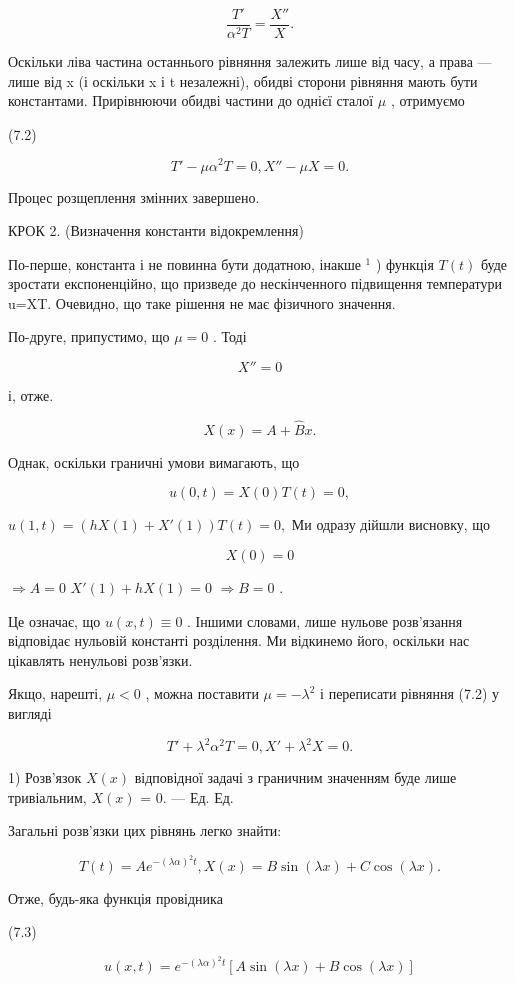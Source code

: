 \documentclass[
  ukrainian,
]{article}
\begin{document}
\[
\frac{T'}{\alpha^2 T} = \frac{X''}{X} .
\]

Оскільки ліва частина останнього рівняння залежить лише від часу, а
права --- лише від x (і оскільки x і t незалежні), обидві сторони
рівняння мають бути константами. Прирівнюючи обидві частини до однієї
сталої \(\mu\) , отримуємо

(7.2)

\[
T' - \mu \alpha^{2} T = 0, X'' - \mu X = 0.
\]

Процес розщеплення змінних завершено.

КРОК 2. (Визначення константи відокремлення)

По-перше, константа і не повинна бути додатною, інакше \(^{1}\) )
функція \(T\left( t\right)\) буде зростати експоненційно, що призведе до
нескінченного підвищення температури u=XT. Очевидно, що таке рішення не
має фізичного значення.

По-друге, припустимо, що \(\mu = 0\) . Тоді

\[
X'' = 0
\]

і, отже.

\[
X(x) = A + \hat{B}x.
\]

Однак, оскільки граничні умови вимагають, що

\[
u(0, t) = X(0) T(t) = 0,
\]

\(u(1, t) = (hX(1) + X'(1)) T(t) = 0,\) Ми одразу дійшли висновку, що

\[
X(0) = 0
\]

\(\Rightarrow A = 0\) \(X'(1) + hX(1) = 0\) \(\Rightarrow B = 0\) .

Це означає, що \(u(x, t) \equiv 0\) . Іншими словами, лише нульове
розв'язання відповідає нульовій константі розділення. Ми відкинемо його,
оскільки нас цікавлять ненульові розв'язки.

Якщо, нарешті, \(\mu < 0\) , можна поставити \(\mu = -\lambda^2\) і
переписати рівняння (7.2) у вигляді

\[
T' + \lambda^2 \alpha^2 T = 0,
X' + \lambda^2 X = 0.
\]

1) Розв'язок \(X(x)\) відповідної задачі з граничним значенням буде лише
тривіальним, \(X(x)\) = 0. --- Ед. Ед.

Загальні розв'язки цих рівнянь легко знайти:

\[
T(t) = Ae^{-(\lambda \alpha)^2 t},
X(x) = B\sin(\lambda x) + C\cos(\lambda x).
\]

Отже, будь-яка функція провідника

(7.3)

\[
u(x, t) = e^{-(\lambda \alpha)^2 t} [A \sin(\lambda x) + B \cos(\lambda x)]
\]
\end{document}
